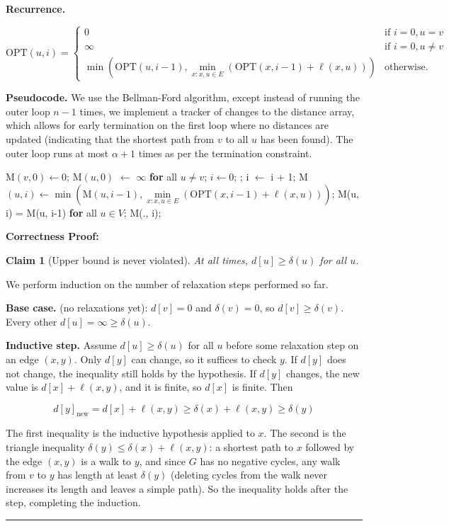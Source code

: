 \documentclass[11pt]{article}
\newenvironment{proof}{{\bf Proof:  }}{\hfill\rule{2mm}{2mm}}
\newtheorem{claim}[fact]{Claim}
\begin{document}
\textbf{Recurrence.} 

$$\text{OPT}(u, i) = \begin{cases} 0 & \text{if } i = 0, u = v 
                    \\ \infty & \text{if } i = 0, u \neq v 
                    \\ \min (\text{OPT}(u, i-1), \underset{x: x, u \in E} {\min} (\text{OPT}(x, i-1) + \ell(x, u))) & \text{otherwise.} \end{cases}$$

\textbf{Pseudocode.} 
We use the Bellman-Ford algorithm, except instead of running the outer loop $n-1$ times, we implement a tracker of changes to the distance array, 
which allows for early termination on the first loop where no distances are updated (indicating that the shortest path from $v$ to all $u$ has been found). 
The outer loop runs at most $\alpha + 1$ times as per the termination constraint.

\begin{algorithmic}[1]
    \State M$(v, 0) \leftarrow 0$;
    \State M$(u, 0)$ $\leftarrow$ $\infty$ \textbf{for} all $u \neq v$;
    \State $i \leftarrow 0$;
    \Repeat;
        \State i $\leftarrow$ i + 1;
         \do
            M$(u, i) \leftarrow \min (\text{M}(u, i-1), \underset{x: x, u \in E} {\min} (\text{OPT}(x, i-1) + \ell(x, u)))$;
        \EndFor
    \Until M(u, i) = M(u, i-1) \textbf{for} all $u \in V$;
    \Return M(., i);
\end{algorithmic}

\bigbreak

\textbf{Correctness Proof:}

\begin{claim}[Upper bound is never violated]\label{cl:lower}
At all times, $d[u] \ge \delta(u)$ for all $u$.
\end{claim}

\begin{proof}
We perform induction on the number of relaxation steps performed so far. 

\textbf{Base case.} 
(no relaxations yet): $d[v] = 0$ and $\delta(v) = 0$, so $d[v] \ge \delta(v)$. Every other $d[u] = \infty \ge \delta(u)$. 

\textbf{Inductive step.} 
Assume $d[u] \ge \delta(u)$ for all $u$ before some relaxation step on an edge $(x,y)$. 
Only $d[y]$ can change, so it suffices to check $y$. If $d[y]$ does not change, the inequality still holds by the hypothesis. 
If $d[y]$ changes, the new value is $d[x] + \ell(x,y)$, and it is finite, so $d[x]$ is finite. Then

$$d[y]_{\text{new}} = d[x] + \ell(x,y) \ge \delta(x) + \ell(x,y) \ge \delta(y)$$

The first inequality is the inductive hypothesis applied to $x$. The second is the triangle inequality $\delta(y) \le \delta(x) + \ell(x,y)$: 
a shortest path to $x$ followed by the edge $(x,y)$ is a walk to $y$, and since $G$ has no negative cycles, 
any walk from $v$ to $y$ has length at least $\delta(y)$ (deleting cycles from the walk never increases its length and leaves a simple path). 
So the inequality holds after the step, completing the induction.
\end{proof}
\end{document}
